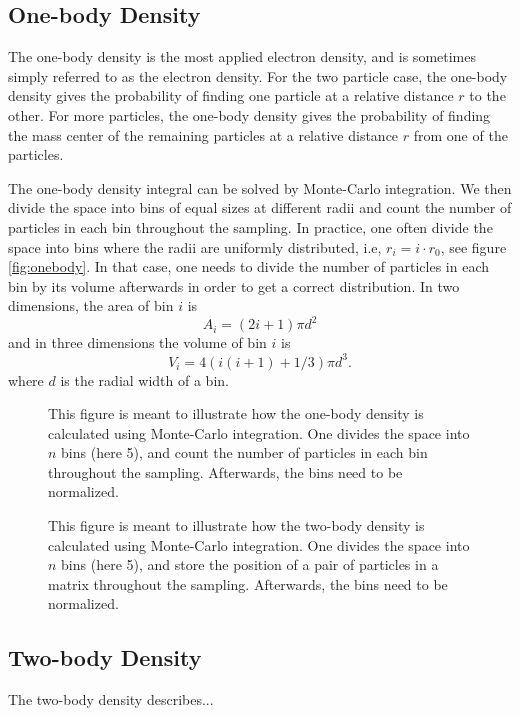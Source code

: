 \subsection{One-body Density}
The one-body density is the most applied electron density, and is sometimes simply referred to as the electron density. For the two particle case, the one-body density gives the probability of finding one particle at a relative distance $r$ to the other. For more particles, the one-body density gives the probability of finding the mass center of the remaining particles at a relative distance $r$ from one of the particles.

The one-body density integral can be solved by Monte-Carlo integration. We then divide the space into bins of equal sizes at different radii and count the number of particles in each bin throughout the sampling. In practice, one often divide the space into bins where the radii are uniformly distributed, i.e, $r_i=i\cdot r_0$, see figure \eqref{fig:onebody}. In that case, one needs to divide the number of particles in each bin by its volume afterwards in order to get a correct distribution. In two dimensions, the area of bin $i$ is
\begin{equation}
A_i=(2i+1)\pi d^2
\end{equation}
and in three dimensions the volume of bin $i$ is
\begin{equation}
V_i=4(i(i+1)+1/3)\pi d^3.
\end{equation}
where $d$ is the radial width of a bin. 

\begin{figure}
	\centering
	\label{fig:onebody}
	
	\caption{This figure is meant to illustrate how the one-body density is calculated using Monte-Carlo integration. One divides the space into $n$ bins (here 5), and count the number of particles in each bin throughout the sampling. Afterwards, the bins need to be normalized.}
\end{figure}

\begin{figure}
	\centering
	\label{fig:twobody}
	
	\caption{This figure is meant to illustrate how the two-body density is calculated using Monte-Carlo integration. One divides the space into $n$ bins (here 5), and store the position of a pair of particles in a matrix throughout the sampling. Afterwards, the bins need to be normalized.}
\end{figure}

\subsection{Two-body Density}
The two-body density describes...


